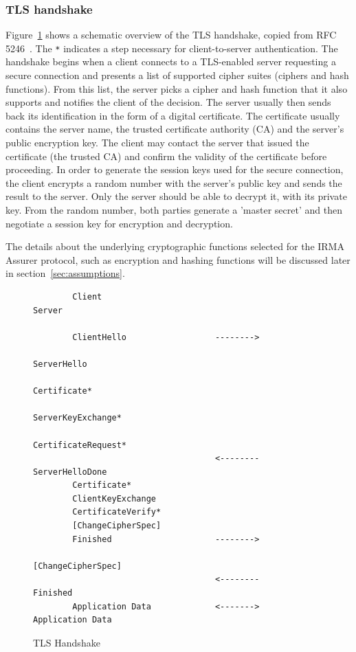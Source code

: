\subsubsection{TLS handshake}
Figure~\ref{fig:tlshandshake} shows a schematic overview of the TLS handshake, copied from RFC 5246~\cite{tls1.2}. The \texttt{*} indicates a step necessary for client-to-server authentication. The handshake begins when a client connects to a TLS-enabled server requesting a secure connection and presents a list of supported cipher suites (ciphers and hash functions). From this list, the server picks a cipher and hash function that it also supports and notifies the client of the decision. The server usually then sends back its identification in the form of a digital certificate. The certificate usually contains the server name, the trusted certificate authority (CA) and the server's public encryption key. The client may contact the server that issued the certificate (the trusted CA) and confirm the validity of the certificate before proceeding. In order to generate the session keys used for the secure connection, the client encrypts a random number with the server's public key and sends the result to the server. Only the server should be able to decrypt it, with its private key. From the random number, both parties generate a 'master secret' and then negotiate a session key for encryption and decryption.

The details about the underlying cryptographic functions selected for the IRMA Assurer protocol, such as encryption and hashing functions will be discussed later in section~\ref{sec:assumptions}.
\begin{figure}[htb]
\centering
\begin{verbatim}
        Client                                               Server

        ClientHello                  -------->
                                                        ServerHello
                                                       Certificate*
                                                 ServerKeyExchange*
                                                CertificateRequest*
                                     <--------      ServerHelloDone
        Certificate*
        ClientKeyExchange
        CertificateVerify*
        [ChangeCipherSpec]
        Finished                     -------->
                                                 [ChangeCipherSpec]
                                     <--------             Finished
        Application Data             <------->     Application Data
\end{verbatim}
\label{fig:tlshandshake}
\caption{TLS Handshake}
\end{figure}

